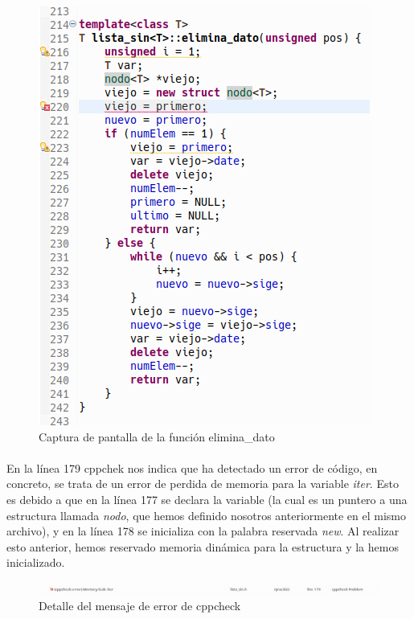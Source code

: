 			\begin{figure}[H]
				\centering
				\includegraphics[scale=0.7]{img/captura45.png}
				\caption{Captura de pantalla de la función elimina\_dato}
				\label{captura45}
			\end{figure}
		
			\paragraph{}En la línea 179 cppchek nos indica que ha detectado un error de código, en concreto, se trata de un error de perdida de memoria para la variable \textit{iter}. Esto es debido a que en la línea 177 se declara la variable (la cual es un puntero a una estructura llamada \textit{nodo}, que hemos definido nosotros anteriormente en el mismo archivo), y en la línea 178 se inicializa con la palabra reservada \textit{new}. Al realizar esto anterior, hemos reservado memoria dinámica para la estructura y la hemos inicializado.
			
			\begin{figure}[H]
				\centering
				\includegraphics[scale=0.38]{img/captura43.png}
				\caption{Detalle del mensaje de error de cppcheck}
				\label{captura43}
			\end{figure}
		
